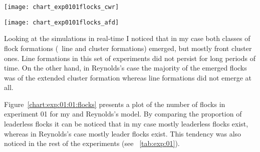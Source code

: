 \begin{figure*}[!t]
  \null\vspace*{2mm}
  \texttt{[image: chart\_exp0101flocks\_cwr]}
  \par\vspace*{2mm}
  \texttt{[image: chart\_exp0101flocks\_afd]}
  \par\vspace*{2mm}
  \caption{Plot of the number of flocks (blue line) and the contribution of leaderless flocks (orange line) for one of the eight experiments used to estimate the flocking ability of Reynolds's model \cite{reynolds:1999} (top chart) and my fuzzy model (bottom chart). Note that because in Reynolds's case the area of potential influence is larger, the number of flocks is lower to begin with, so the values cannot be directly compared. However, since the number of flocks in both cases decreases through time it can be concluded that the two models present flocking ability. Beside this, it can also be noticed that the fuzzy model produces mostly leaderless flocks whereas Reynolds's model mostly leader flocks.}
  \label{chart:exp:01:01:flocks}
\end{figure*}

Looking at the simulations in real-time I noticed that in my case both classes of flock formations (\ie\ line and cluster formations) emerged, but mostly front cluster ones. Line formations in this set of experiments did not persist for long periods of time. On the other hand, in Reynolds's case the majority of the emerged flocks was of the extended cluster formation whereas line formations did not emerge at all.

Figure~\ref{chart:exp:01:01:flocks} presents a plot of the number of flocks in experiment 01 for my and Reynolds's model. By comparing the proportion of leaderless flocks it can be noticed that in my case mostly leaderless flocks exist, whereas in Reynolds's case mostly leader flocks exist. This tendency was also noticed in the rest of the experiments (see \tab~\ref{tab:exp:01}).

